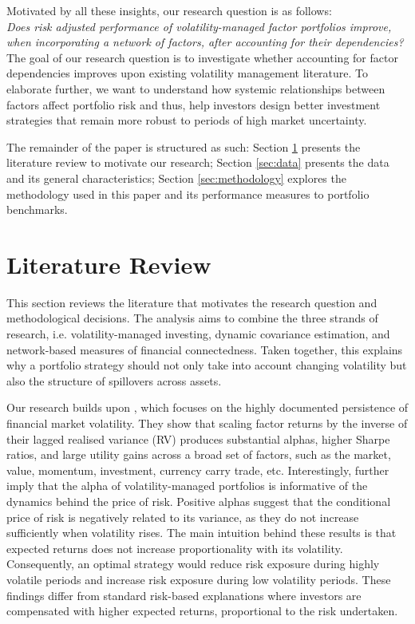 \documentclass[11pt]{article}
\begin{document}
Motivated by all these insights, our research question is as follows:
\\

\noindent \textit{Does risk adjusted performance of volatility-managed factor portfolios improve, when incorporating a network of factors, after accounting for their dependencies?}
\\

The goal of our research question is to investigate whether accounting for factor dependencies improves upon existing volatility management literature. To elaborate further, we want to understand how systemic relationships between factors affect portfolio risk and thus, help investors design better investment strategies that remain more robust to periods of high market uncertainty. 

The remainder of the paper is structured as such: Section \ref{sec:literature_review} presents the literature review to motivate our research; Section \ref{sec:data} presents the data and its general characteristics; Section \ref{sec:methodology} explores the methodology used in this paper and its performance measures to portfolio benchmarks. 

\section{Literature Review}
\label{sec:literature_review}

This section reviews the literature that motivates the research question and methodological decisions. The analysis aims to combine the three strands of research, i.e. volatility-managed investing, dynamic covariance estimation, and network-based measures of financial connectedness. Taken together, this explains why a portfolio strategy should not only take into account changing volatility but also the structure of spillovers across assets. 

Our research builds upon \cite{moreira2017volatility}, which focuses on the highly documented persistence of financial market volatility. They show that scaling factor returns by the inverse of their lagged realised variance (RV) produces substantial alphas, higher Sharpe ratios, and large utility gains across a broad set of factors, such as the market, value, momentum,  investment, currency carry trade, etc. Interestingly, \cite{moreira2017volatility} further imply that the alpha of volatility-managed portfolios is informative of the dynamics behind the price of risk. Positive alphas suggest that the conditional price of risk is negatively related to its variance, as they do not increase sufficiently when volatility rises. The main intuition behind these results is that expected returns does not increase proportionality with its volatility. Consequently, an optimal strategy would reduce risk exposure during highly volatile periods and increase risk exposure during low volatility periods. These findings differ from standard risk-based explanations where investors are compensated with higher expected returns, proportional to the risk undertaken. 
\end{document}
